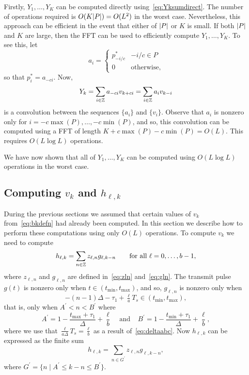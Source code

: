 \documentclass[journal]{IEEEtranTCOM}
\begin{document}
Firstly, $Y_1, \dots, Y_K$  can be computed directly using~\eqref{eq:Yksumdirect}. The number of operations required is $O(K{\left\vert P \right\vert}) = O(L^2)$ in the worst case.  Nevertheless, this approach can be efficient in the event that either of ${\left\vert P \right\vert}$ or $K$ is small.  If both ${\left\vert P \right\vert}$ and $K$ are large, then the FFT can be used to efficiently compute $Y_1, \dots, Y_K$.  To see this, let
\[
a_i = \begin{cases}
p_{-i/c}^* & -i/c \in P \\
0 & \text{otherwise},
\end{cases}
\] 
so that $p_i^* = a_{-ci}$.  Now,
\[
Y_k = \sum_{i \in {\mathbb Z}} a_{-ci} v_{k+ci} = \sum_{i \in {\mathbb Z}} a_i v_{k-i}
\]
is a convolution between the sequences $\{a_{i}\}$ and $\{v_i\}$.  Observe that $a_i$ is nonzero only for $i = -c\max(P), \dots, -c\min(P)$, %
and so, this convolution can be computed using a FFT of length $K + c\max(P) - c\min(P) = O(L)$.  This requires $O(L \log L)$ operations.
  

We have now shown that all of $Y_1,\dots,Y_K$ can be computed using $O(L\log L)$ operations in the worst case.

\subsection{Computing $v_k$ and $h_{\ell,k}$}\label{sec:computing-h_ell-k}

During the previous sections we assumed that certain values of $v_k$ from~\eqref{eq:bkdefn} had already been computed.  In this section we describe how to perform these computations using only $O(L)$ operations.  To compute $v_k$ we need to compute
\[
h_{\ell,k} = \sum_{n\in{\mathbb Z}}z_{\ell,n}g_{\ell,k-n} \qquad \text{for all $\ell = 0, \dots, b-1$},
\]
where $z_{\ell,n}$ and $g_{\ell,n}$ are defined in~\eqref{eq:zln} and~\eqref{eq:gln}. 
The transmit pulse $g(t)$ is nonzero only when $t \in (t_{\text{min}}, t_{\text{max}})$, and so, $g_{\ell,n}$ is nonzero only when
\[
-(n-1) \Delta - \tau_1 + \tfrac{\ell}{a}T_s \in (t_{\text{min}}, t_{\text{max}}),
\]
that is, only when $A^\prime < n < B^\prime$ where 
\[
A^\prime = 1 - \frac{t_{\text{max}} + \tau_1}{\Delta} + \frac{\ell}{b} \;\;\;\; \text{and} \;\;\;\; B^\prime =  1 - \frac{t_{\text{min}} + \tau_1}{\Delta} + \frac{\ell}{b},
\]
where we use that $\frac{\ell}{a\Delta}T_s = \tfrac{\ell}{b}$ as a result of~\eqref{eq:deltaabc}.  Now $h_{\ell,k}$ can be expressed as the finite sum
\begin{equation}\label{eq:bkbyconvslow}
h_{\ell,k} = \sum_{n \in G^{\prime}}z_{\ell,n}g_{\ell,k-n},
\end{equation}
where $G^{\prime} = \{ n \mid  A^\prime \leq  k-n  \leq B^\prime \}$.  
\end{document}
